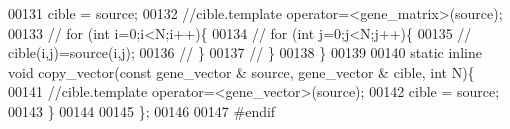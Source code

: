 \begin{DoxyCode}
00131     cible = source;
00132     \textcolor{comment}{//cible.template operator=<gene\_matrix>(source);}
00133 \textcolor{comment}{//     for (int i=0;i<N;i++)\{}
00134 \textcolor{comment}{//       for (int j=0;j<N;j++)\{}
00135 \textcolor{comment}{//         cible(i,j)=source(i,j);}
00136 \textcolor{comment}{//       \}}
00137 \textcolor{comment}{//     \}}
00138   \}
00139 
00140   \textcolor{keyword}{static} \textcolor{keyword}{inline} \textcolor{keywordtype}{void} copy\_vector(\textcolor{keyword}{const} gene\_vector & source, gene\_vector & cible, \textcolor{keywordtype}{int} N)\{
00141     \textcolor{comment}{//cible.template operator=<gene\_vector>(source);}
00142     cible = source;
00143   \}
00144 
00145 \};
00146 
00147 \textcolor{preprocessor}{#endif}
\end{DoxyCode}
